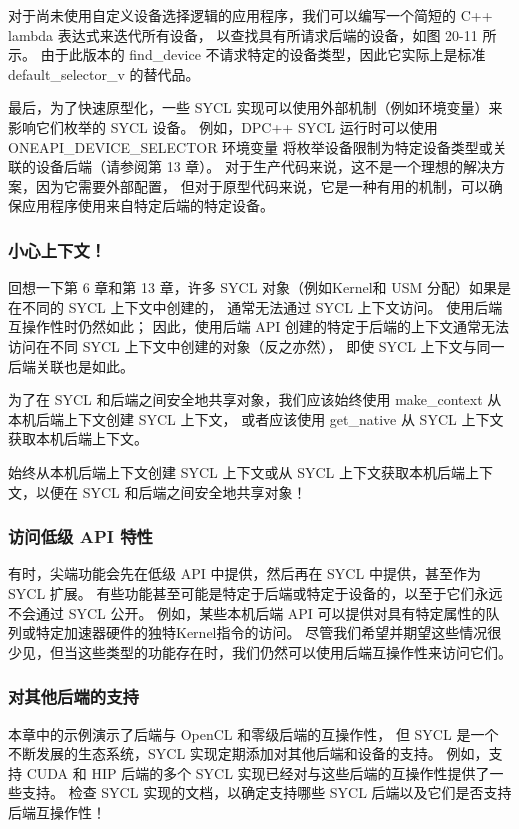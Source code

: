 对于尚未使用自定义设备选择逻辑的应用程序，我们可以编写一个简短的 C++ lambda 表达式来迭代所有设备，
以查找具有所请求后端的设备，如图 20-11 所示。 
由于此版本的 find\_device 不请求特定的设备类型，因此它实际上是标准 default\_selector\_v 的替代品。

最后，为了快速原型化，一些 SYCL 实现可以使用外部机制（例如环境变量）来影响它们枚举的 SYCL 设备。 
例如，DPC++ SYCL 运行时可以使用 ONEAPI\_DEVICE\_SELECTOR 环境变量
将枚举设备限制为特定设备类型或关联的设备后端（请参阅第 13 章）。 
对于生产代码来说，这不是一个理想的解决方案，因为它需要外部配置，
但对于原型代码来说，它是一种有用的机制，可以确保应用程序使用来自特定后端的特定设备。

\subsubsection{小心上下文！}
回想一下第 6 章和第 13 章，许多 SYCL 对象（例如Kernel和 USM 分配）如果是在不同的 SYCL 上下文中创建的，
通常无法通过 SYCL 上下文访问。 使用后端互操作性时仍然如此； 
因此，使用后端 API 创建的特定于后端的上下文通常无法访问在不同 SYCL 上下文中创建的对象（反之亦然），
即使 SYCL 上下文与同一后端关联也是如此。

为了在 SYCL 和后端之间安全地共享对象，我们应该始终使用 make\_context 从本机后端上下文创建 SYCL 上下文，
或者应该使用 get\_native 从 SYCL 上下文获取本机后端上下文。

\begin{remark}
	始终从本机后端上下文创建 SYCL 上下文或从 SYCL 上下文获取本机后端上下文，以便在 SYCL 和后端之间安全地共享对象！
\end{remark}

\subsubsection{访问低级 API 特性}
有时，尖端功能会先在低级 API 中提供，然后再在 SYCL 中提供，甚至作为 SYCL 扩展。 
有些功能甚至可能是特定于后端或特定于设备的，以至于它们永远不会通过 SYCL 公开。 
例如，某些本机后端 API 可以提供对具有特定属性的队列或特定加速器硬件的独特Kernel指令的访问。 
尽管我们希望并期望这些情况很少见，但当这些类型的功能存在时，我们仍然可以使用后端互操作性来访问它们。

\subsubsection{对其他后端的支持}
本章中的示例演示了后端与 OpenCL 和零级后端的互操作性，
但 SYCL 是一个不断发展的生态系统，SYCL 实现定期添加对其他后端和设备的支持。 
例如，支持 CUDA 和 HIP 后端的多个 SYCL 实现已经对与这些后端的互操作性提供了一些支持。 
检查 SYCL 实现的文档，以确定支持哪些 SYCL 后端以及它们是否支持后端互操作性！

